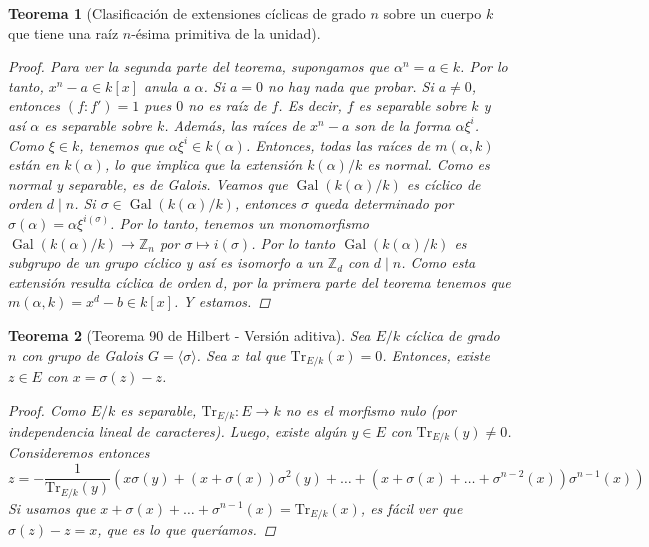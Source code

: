 \documentclass[12pt]{book}
\newtheorem{teo}{Teorema}[section]
\theoremstyle{definition}
\newcommand{\ZZ}{\mathbb{Z}}      %
\DeclareMathOperator{\Gal}{Gal}
\begin{document}
\begin{teo}[Clasificación de extensiones cíclicas de grado $n$ sobre un cuerpo $k$ que tiene una raíz $n$-ésima primitiva de la unidad]
\begin{proof}
Para ver la segunda parte del teorema, supongamos que $\alpha^n = a\in k$. Por lo tanto, $x^n - a\in k[x]$ anula a $\alpha$. Si $a=0$ no hay nada que probar. Si $a\neq 0$, entonces $(f:f') = 1$ pues $0$ no es raíz de $f$. Es decir, $f$ es separable sobre $k$ y así $\alpha$ es separable sobre $k$. Además, las raíces de $x^n - a$ son de la forma $\alpha\xi^i$. Como $\xi \in k$, tenemos que $\alpha\xi^i\in k(\alpha)$. Entonces, todas las raíces de $m(\alpha,k)$ están en $k(\alpha)$, lo que implica que la extensión $k(\alpha)/k$ es normal. Como es normal y separable, es de Galois. Veamos que $\Gal(k(\alpha)/k)$ es cíclico de orden $d\mid n$. Si $\sigma\in \Gal(k(\alpha)/k)$, entonces $\sigma$ queda determinado por $\sigma(\alpha)=\alpha\xi^{i(\sigma)}$. Por lo tanto, tenemos un monomorfismo $\Gal(k(\alpha)/k)\to \ZZ_n$ por $\sigma\mapsto i(\sigma)$. Por lo tanto $\Gal(k(\alpha)/k)$ es subgrupo de un grupo cíclico y así es isomorfo a un $\ZZ_d$ con $d\mid n$. Como esta extensión resulta cíclica de orden $d$, por la primera parte del teorema tenemos que $m(\alpha,k) = x^d - b\in k[x]$. Y estamos.
\end{proof}
\end{teo}

\begin{teo}[Teorema 90 de Hilbert - Versión aditiva]
Sea $E/k$ cíclica de grado $n$ con grupo de Galois $G=\langle\sigma\rangle$. Sea $x$ tal que $\mathrm{Tr}_{E/k}(x)=0$. Entonces, existe $z\in E$ con $x=\sigma(z)-z$.
\begin{proof}
Como $E/k$ es separable, $\mathrm{Tr}_{E/k}:E\to k$ no es el morfismo nulo (por independencia lineal de caracteres). Luego, existe algún $y\in E$ con $\mathrm{Tr}_{E/k}(y)\neq 0$. Consideremos entonces $$ z = -\dfrac{1}{\mathrm{Tr}_{E/k}(y)}(x\sigma(y) + (x+\sigma(x))\sigma^2(y) +  \ldots + (x+\sigma(x)+\ldots + \sigma^{n-2}(x))\sigma^{n-1}(x))$$ Si usamos que $x + \sigma(x) + \ldots + \sigma^{n-1}(x)=\mathrm{Tr}_{E/k}(x)$, es fácil ver que $\sigma(z)-z=x$, que es lo que queríamos.
\end{proof}
\end{teo}
\end{document}
